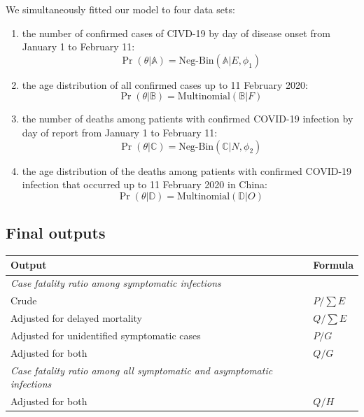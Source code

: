 \documentclass{article}
\begin{document}
We simultaneously fitted our model to four data sets: 
\begin{enumerate}
	\item the number of confirmed cases of CIVD-19 by day of disease onset from January 1 to February 11:
	\begin{equation}
	\Pr(\theta| \mathds{A}) = \text{Neg-Bin}(\mathds{A}|E,\phi_1)
	\end{equation}
	
	\item the age distribution of all confirmed cases up to 11 February 2020:
	\begin{equation}
	\Pr(\theta| \mathds{B}) = \text{Multinomial}(\mathds{B}|F)
	\end{equation}
	
	\item the number of deaths among patients with confirmed COVID-19 infection by day of report from January 1 to February 11:
	\begin{equation}
	\Pr(\theta| \mathds{C}) = \text{Neg-Bin}(\mathds{C}|N,\phi_2)
	\end{equation}
	
	\item the age distribution of the deaths among patients with confirmed COVID-19 infection that occurred up to 11 February 2020 in China:
	\begin{equation}
	\Pr(\theta| \mathds{D}) = \text{Multinomial}(\mathds{D}|O)
	\end{equation}
\end{enumerate}


\subsection{Final outputs}

\begin{table}[h]
	\centering

\begin{tabular}{ll}
	
	\hline
	Output & Formula \\
	\hline
	\textit{Case fatality ratio among symptomatic infections} &  \\
	Crude & $P/\sum E$  \\
	
	Adjusted for delayed mortality  &  $Q/\sum E$ \\
	
	Adjusted for unidentified symptomatic cases  &  $P/G$\\
	
	Adjusted for both &  $Q/G$\\
	
	\textit{Case fatality ratio among all symptomatic and asymptomatic infections} & \\
	Adjusted for both  &  $Q/H$ \\
	\hline
\end{tabular}
\end{table}

%
\end{document}
